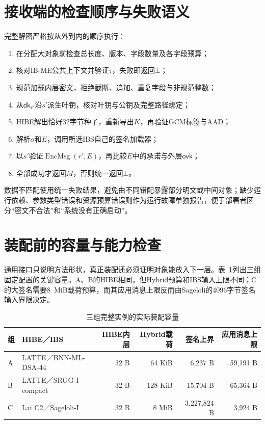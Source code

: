 \documentclass[UTF8,a4paper,12pt,oneside,openany,fontset=fandol]{ctexrep}
\begin{document}
\section{接收端的检查顺序与失败语义}
完整解密严格按从外到内的顺序执行：
\begin{enumerate}
  \item 在分配大对象前检查总长度、版本、字段数量及各字段预算；
  \item 核对IB-ME公共上下文并验证\(\tau\)，失败即返回\(\bot\)；
  \item 规范加载内层密文，拒绝截断、追加、重复字段与非规范整数；
  \item 从\(\mathsf{dk}_{r'}\)沿\(s'\)派生叶钥，核对叶钥与公钥及完整路径绑定；
  \item HIBE解出恰好32字节种子，重新导出\(K\)，再验证GCM标签与AAD；
  \item 解析\(\sigma\)和\(E\)，调用所选IBS自己的签名加载器；
  \item 以\(s'\)验证\(\operatorname{EncMsg}(r',E)\)，再比较\(E\)中的承诺与外层\(\mathsf{ovk}\)；
  \item 全部成功才返回\(M\)，否则统一返回\(\bot\)。
\end{enumerate}
数据不匹配使用统一失败结果，避免由不同错配暴露部分明文或中间对象；缺少运行依赖、参数类型错误和资源预算错误则作为运行故障单独报告，便于部署者区分“密文不合法”和“系统没有正确启动”。

\section{装配前的容量与能力检查}
通用接口只说明方法形状，真正装配还必须证明对象能放入下一层。表~\ref{tab:suite-capacity}列出三组固定配置的关键容量。A、B的HIBE相同，但Hybrid预算和IBS输入上限不同；C的大签名需要8~MiB载荷预算，而其应用消息上限反而由Sageloli的4096字节签名输入界限决定。

\begin{table}[htbp]
\centering
\small
\caption{三组完整实例的实际装配容量}
\label{tab:suite-capacity}
\begin{tabular}{@{}l>{\raggedright\arraybackslash}p{}rrrr@{}}
\toprule
\rowcolor{black!8} 组 & HIBE／IBS & HIBE内层 & Hybrid载荷 & 签名上界 & 应用消息上限 \\
\midrule
A & LATTE／BNN-ML-DSA-44 & 32 B & 64 KiB & 6,237 B & 59,191 B \\
B & LATTE／SRGG-I compact & 32 B & 128 KiB & 15,704 B & 65,364 B \\
C & Lai C2／Sageloli-I & 32 B & 8 MiB & 3,227,824 B & 3,924 B \\
\bottomrule
\end{tabular}
\end{table}
\end{document}
